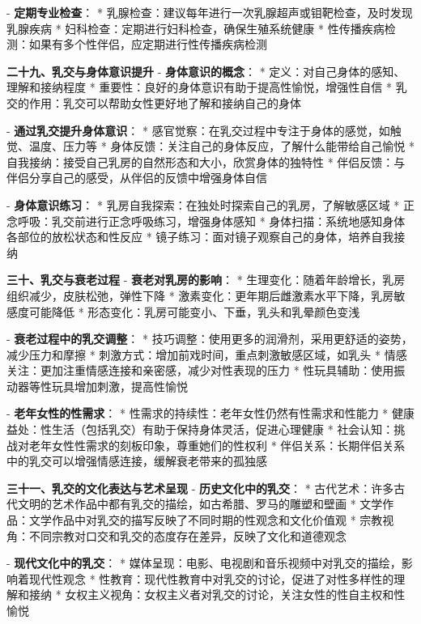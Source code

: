 \begin{enumerate}
  - \textbf{定期专业检查}：
    * 乳腺检查：建议每年进行一次乳腺超声或钼靶检查，及时发现乳腺疾病
    * 妇科检查：定期进行妇科检查，确保生殖系统健康
    * 性传播疾病检测：如果有多个性伴侣，应定期进行性传播疾病检测

  \textbf{二十九、乳交与身体意识提升}
  - \textbf{身体意识的概念}：
    * 定义：对自己身体的感知、理解和接纳程度
    * 重要性：良好的身体意识有助于提高性愉悦，增强性自信
    * 乳交的作用：乳交可以帮助女性更好地了解和接纳自己的身体

  - \textbf{通过乳交提升身体意识}：
    * 感官觉察：在乳交过程中专注于身体的感觉，如触觉、温度、压力等
    * 身体反馈：关注自己的身体反应，了解什么能带给自己愉悦
    * 自我接纳：接受自己乳房的自然形态和大小，欣赏身体的独特性
    * 伴侣反馈：与伴侣分享自己的感受，从伴侣的反馈中增强身体自信

  - \textbf{身体意识练习}：
    * 乳房自我探索：在独处时探索自己的乳房，了解敏感区域
    * 正念呼吸：乳交前进行正念呼吸练习，增强身体感知
    * 身体扫描：系统地感知身体各部位的放松状态和性反应
    * 镜子练习：面对镜子观察自己的身体，培养自我接纳

  \textbf{三十、乳交与衰老过程}
  - \textbf{衰老对乳房的影响}：
    * 生理变化：随着年龄增长，乳房组织减少，皮肤松弛，弹性下降
    * 激素变化：更年期后雌激素水平下降，乳房敏感度可能降低
    * 形态变化：乳房可能变小、下垂，乳头和乳晕颜色变浅

  - \textbf{衰老过程中的乳交调整}：
    * 技巧调整：使用更多的润滑剂，采用更舒适的姿势，减少压力和摩擦
    * 刺激方式：增加前戏时间，重点刺激敏感区域，如乳头
    * 情感关注：更加注重情感连接和亲密感，减少对性表现的压力
    * 性玩具辅助：使用振动器等性玩具增加刺激，提高性愉悦

  - \textbf{老年女性的性需求}：
    * 性需求的持续性：老年女性仍然有性需求和性能力
    * 健康益处：性生活（包括乳交）有助于保持身体灵活，促进心理健康
    * 社会认知：挑战对老年女性性需求的刻板印象，尊重她们的性权利
    * 伴侣关系：长期伴侣关系中的乳交可以增强情感连接，缓解衰老带来的孤独感

  \textbf{三十一、乳交的文化表达与艺术呈现}
  - \textbf{历史文化中的乳交}：
    * 古代艺术：许多古代文明的艺术作品中都有乳交的描绘，如古希腊、罗马的雕塑和壁画
    * 文学作品：文学作品中对乳交的描写反映了不同时期的性观念和文化价值观
    * 宗教视角：不同宗教对口交和乳交的态度存在差异，反映了文化和道德观念

  - \textbf{现代文化中的乳交}：
    * 媒体呈现：电影、电视剧和音乐视频中对乳交的描绘，影响着现代性观念
    * 性教育：现代性教育中对乳交的讨论，促进了对性多样性的理解和接纳
    * 女权主义视角：女权主义者对乳交的讨论，关注女性的性自主权和性愉悦


\end{enumerate}
